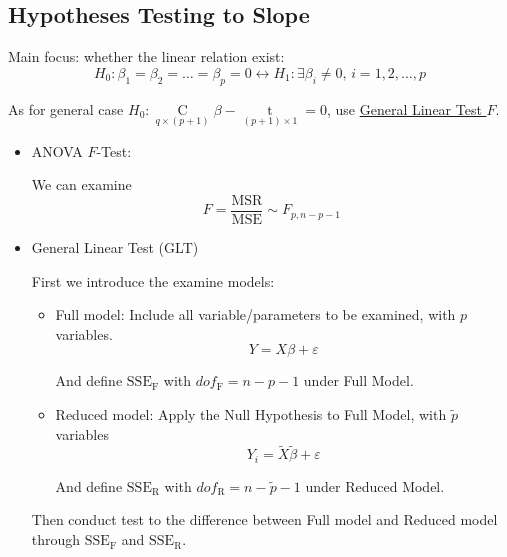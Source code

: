 \subsection{Hypotheses Testing to Slope}\label{SubSubSectionGeneralLinearTest}
    Main focus: whether the linear relation exist:
\begin{equation}
    H_0:\beta _1=\beta _2=\ldots=\beta _p=0\longleftrightarrow H_1:\exists \beta _i\neq 0,\, i=1,2,\ldots,p
\end{equation}

    As for general case $ H_0:\mathop{C}\limits_{q\times (p+1)} \beta -\mathop{t}\limits_{(p+1)\times 1}  = 0$, use \hyperlink{HyperlinkGLT}{General Linear Test $ F $}.

\begin{itemize}[topsep=2pt,itemsep=2pt]
\item ANOVA $ F $-Test:
    
    We can examine  
    \begin{equation}
        F=\dfrac{\mathrm{MSR}}{\mathrm{MSE}}\sim F_{p,n-p-1} 
    \end{equation}
    
\item General Linear Test (GLT)
    
    First we introduce the examine models:
    \begin{itemize}[topsep=2pt,itemsep=2pt]
        \item Full model: Include all variable/parameters to be examined, with $ p $ variables.
        \begin{equation}
            Y=X\beta +\varepsilon
        \end{equation}

        And define $ \mathrm{SSE}_\mathrm{F} $ with $ dof_\mathrm{F}=n-p-1 $ under Full Model.
        \item Reduced model: Apply the Null Hypothesis to Full Model, with $ \tilde{p} $ variables
        \begin{equation}
         Y_i=\tilde{X}\tilde{\beta }+\varepsilon 
        \end{equation}
        
        And define $ \mathrm{SSE}_\mathrm{R} $ with $ dof_\mathrm{R}=n-\tilde{p}-1 $ under Reduced Model.
    \end{itemize}

    Then conduct test to the difference between Full model and Reduced model through $ \mathrm{SSE}_\mathrm{F}  $ and $ \mathrm{SSE}_\mathrm{R}  $.


\end{itemize}
